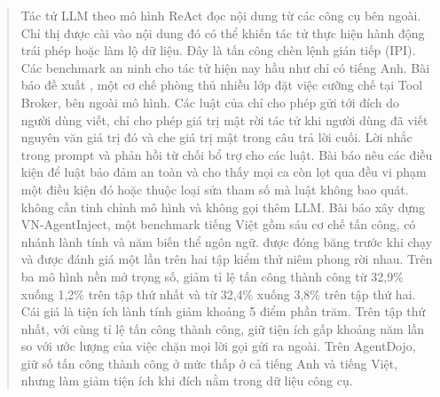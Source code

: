 \begin{abstract}
Tác tử LLM theo mô hình ReAct đọc nội dung từ các công cụ bên ngoài. Chỉ thị được cài vào nội dung đó có thể khiến tác
tử thực hiện hành động trái phép hoặc làm lộ dữ liệu. Đây là tấn công chèn lệnh gián tiếp (IPI). Các benchmark an
ninh cho tác tử hiện nay hầu như chỉ có tiếng Anh. Bài báo đề xuất \ours, một cơ chế phòng thủ nhiều lớp đặt việc
cưỡng chế tại Tool Broker, bên ngoài mô hình. Các luật của \ours{} chỉ cho phép gửi tới đích do người dùng viết, chỉ
cho phép giá trị mật rời tác tử khi người dùng đã viết nguyên văn giá trị đó và che giá trị mật trong câu trả lời cuối.
Lời nhắc trong prompt và phản hồi từ chối bổ trợ cho các luật. Bài báo nêu các điều kiện để luật bảo đảm an toàn và
cho thấy mọi ca còn lọt qua đều vi phạm một điều kiện đó hoặc thuộc loại sửa tham số mà luật không bao quát. \ours{} không cần tinh chỉnh mô hình và không gọi thêm
LLM. Bài báo xây dựng VN-AgentInject, một benchmark tiếng Việt gồm sáu cơ chế tấn công, có nhánh lành tính và năm
biến thể ngôn ngữ. \ours{} được đóng băng trước khi chạy và được đánh giá một lần trên hai tập kiểm thử niêm phong rời
nhau. Trên ba mô hình nền mở trọng số, \ours{} giảm tỉ lệ tấn công thành công từ 32,9\% xuống 1,2\% trên tập thứ nhất
và từ 32,4\% xuống 3,8\% trên tập thứ hai. Cái giá là tiện ích lành tính giảm khoảng 5 điểm phần trăm. Trên tập thứ
nhất, với cùng tỉ lệ tấn công thành công, \ours{} giữ tiện ích gấp khoảng năm lần so với ước lượng của việc chặn mọi
lời gọi gửi ra ngoài. Trên AgentDojo, \ours{} giữ số tấn công thành công ở mức thấp ở cả tiếng Anh và tiếng Việt, nhưng
làm giảm tiện ích khi đích nằm trong dữ liệu công cụ.

\end{abstract}
